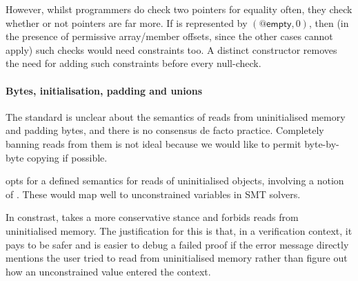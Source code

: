 However, whilst programmers do check two pointers for equality often, they
check whether or not pointers are  far more. If  is
represented by $(@\mathsf{empty}, 0)$, then (in the presence of permissive
array/member offsets, since the other cases cannot apply) such checks would
need constraints too. A distinct  constructor removes the need
for adding such constraints before every null-check.

\paragraph{Bytes, initialisation, padding and unions}%

The  standard is unclear about the semantics of reads from
uninitialised memory and padding bytes, and there is no consensus de facto
practice. Completely banning reads from them is not ideal because we would like
to permit byte-by-byte copying if possible.

 opts for a defined semantics for reads of uninitialised objects,
involving a notion of . These would map well to
unconstrained variables in SMT solvers.

In constrast,  takes a more conservative stance and forbids reads from
uninitialised memory. The justification for this is that, in a verification
context, it pays to be safer and is easier to debug a failed proof if the error
message directly mentions the user tried to read from uninitialised memory
rather than figure out how an unconstrained value entered the context.


